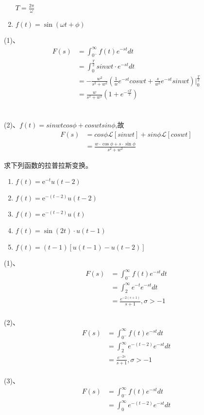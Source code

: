 \documentclass[answers]{exam}  %
\begin{document}
\begin{questions}
\begin{enumerate}[(1)]
$T=\frac{2\pi}{\omega}$
\item $f(t)=\sin(\omega t+\phi)$
\end{enumerate}
\begin{solution}
(1)、
\begin{align*}
	F(s)&=\int_{0^-}^\infty f(t)e^{-st}dt\\
	&=\int_0^{\frac{T}{2}}sinwt\cdot e^{-st}dt\\
	&=-\frac{w^2}{s^2+w^2}(\frac{1}{w}e^{-st}coswt+\frac{s}{w^2}e^{-st}sinwt)|_0^{\frac{T}{2}}\\
	&=\frac{w}{s^2+w^2}(1+e^{-\frac{sT}{2}})
\end{align*}\\
~\\
(2)、$f(t)=sinwtcos\phi+coswtsin\phi$,故
\begin{align*}
	F(s)&=cos\phi\mathcal{L}[sinwt]+sin\phi\mathcal{L}[coswt]\\
	&=\frac{w\cdot\cos\phi+s\cdot\sin\phi}{s^2+w^2}
\end{align*}
\end{solution}
\newpage
\question 求下列函数的拉普拉斯变换。
\begin{enumerate}[(1)]
\item $f(t)=\mathrm{e}^{-t}u(t-2)$
\item $f(t)=\mathrm{e}^{-(t-2)}u(t-2)$
\item $f(t)=\mathrm{e}^{-(t-2)}u(t)$
\item $f(t)=\sin(2t)\cdot u(t-1)$
\item $f(t)=(t-1)[u(t-1)-u(t-2)]$
\end{enumerate}
\begin{solution}
(1)、
\begin{align*}
	F(s)&=\int_{0^-}^\infty f(t)e^{-st}dt\\
	&=\int_2^\infty e^{-t}e^{-st}dt\\
	&=\frac{e^{-2(s+1)}}{s+1},\sigma>-1
\end{align*}
~\\
(2)、
\begin{align*}
	F(s)&=\int_{0^-}^\infty f(t)e^{-st}dt\\
	&=\int_2^\infty e^{-(t-2)}e^{-st}dt\\
	&=\frac{e^{-2s}}{s+1},\sigma>-1
\end{align*}
~\\
(3)、
\begin{align*}
	F(s)&=\int_{0^-}^\infty f(t)e^{-st}dt\\
	&=\int_0^\infty e^{-(t-2)}e^{-st}dt\\

\end{align*}
\end{solution}
\end{questions}
\end{document}

